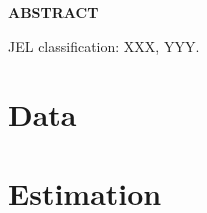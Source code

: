 \documentclass[11pt]{article}
\newtheorem{condition}{CONDITION}
\begin{document}
\onehalfspacing      %
\renewcommand{\footnote}{\endnote}  %




\maketitle
\thispagestyle{empty}

\bigskip

\centerline{\bf ABSTRACT}

\begin{doublespace}  %
  \noindent 
  
\end{doublespace}

\medskip

\noindent JEL classification: XXX, YYY.

\clearpage



\noindent 


\section{Data} \label{sec:Data}


\section{Estimation} \label{sec:Estimation}







\end{document}
